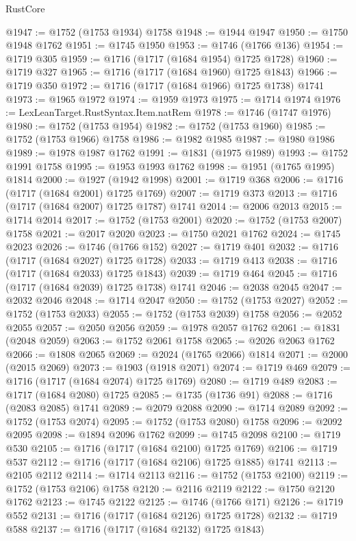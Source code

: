 \begin{lexlean}{RustCore}
\begin{coremodule}
@1947 := @1752 (@1753 @1934) @1758
@1948 := @1944 @1947
@1950 := @1750 @1948 @1762
@1951 := @1745 @1950
@1953 := @1746 (@1766 @136)
@1954 := @1719 @305
@1959 := @1716 (@1717 (@1684 @1954) @1725 @1728)
@1960 := @1719 @327
@1965 := @1716 (@1717 (@1684 @1960) @1725 @1843)
@1966 := @1719 @350
@1972 := @1716 (@1717 (@1684 @1966) @1725 @1738) @1741
@1973 := @1965 @1972
@1974 := @1959 @1973
@1975 := @1714 @1974
@1976 := LexLeanTarget.RustSyntax.Item.natRem
@1978 := @1746 (@1747 @1976)
@1980 := @1752 (@1753 @1954)
@1982 := @1752 (@1753 @1960)
@1985 := @1752 (@1753 @1966) @1758
@1986 := @1982 @1985
@1987 := @1980 @1986
@1989 := @1978 @1987 @1762
@1991 := @1831 (@1975 @1989)
@1993 := @1752 @1991 @1758
@1995 := @1953 @1993 @1762
@1998 := @1951 (@1765 @1995) @1814
@2000 := @1927 (@1942 @1998)
@2001 := @1719 @368
@2006 := @1716 (@1717 (@1684 @2001) @1725 @1769)
@2007 := @1719 @373
@2013 := @1716 (@1717 (@1684 @2007) @1725 @1787) @1741
@2014 := @2006 @2013
@2015 := @1714 @2014
@2017 := @1752 (@1753 @2001)
@2020 := @1752 (@1753 @2007) @1758
@2021 := @2017 @2020
@2023 := @1750 @2021 @1762
@2024 := @1745 @2023
@2026 := @1746 (@1766 @152)
@2027 := @1719 @401
@2032 := @1716 (@1717 (@1684 @2027) @1725 @1728)
@2033 := @1719 @413
@2038 := @1716 (@1717 (@1684 @2033) @1725 @1843)
@2039 := @1719 @464
@2045 := @1716 (@1717 (@1684 @2039) @1725 @1738) @1741
@2046 := @2038 @2045
@2047 := @2032 @2046
@2048 := @1714 @2047
@2050 := @1752 (@1753 @2027)
@2052 := @1752 (@1753 @2033)
@2055 := @1752 (@1753 @2039) @1758
@2056 := @2052 @2055
@2057 := @2050 @2056
@2059 := @1978 @2057 @1762
@2061 := @1831 (@2048 @2059)
@2063 := @1752 @2061 @1758
@2065 := @2026 @2063 @1762
@2066 := @1808 @2065
@2069 := @2024 (@1765 @2066) @1814
@2071 := @2000 (@2015 @2069)
@2073 := @1903 (@1918 @2071)
@2074 := @1719 @469
@2079 := @1716 (@1717 (@1684 @2074) @1725 @1769)
@2080 := @1719 @489
@2083 := @1717 (@1684 @2080) @1725
@2085 := @1735 (@1736 @91)
@2088 := @1716 (@2083 @2085) @1741
@2089 := @2079 @2088
@2090 := @1714 @2089
@2092 := @1752 (@1753 @2074)
@2095 := @1752 (@1753 @2080) @1758
@2096 := @2092 @2095
@2098 := @1894 @2096 @1762
@2099 := @1745 @2098
@2100 := @1719 @530
@2105 := @1716 (@1717 (@1684 @2100) @1725 @1769)
@2106 := @1719 @537
@2112 := @1716 (@1717 (@1684 @2106) @1725 @1885) @1741
@2113 := @2105 @2112
@2114 := @1714 @2113
@2116 := @1752 (@1753 @2100)
@2119 := @1752 (@1753 @2106) @1758
@2120 := @2116 @2119
@2122 := @1750 @2120 @1762
@2123 := @1745 @2122
@2125 := @1746 (@1766 @171)
@2126 := @1719 @552
@2131 := @1716 (@1717 (@1684 @2126) @1725 @1728)
@2132 := @1719 @588
@2137 := @1716 (@1717 (@1684 @2132) @1725 @1843)

\end{coremodule}
\end{lexlean}
